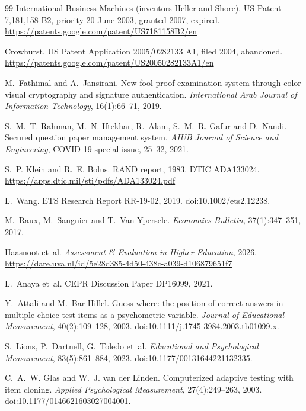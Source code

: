 \documentclass[10pt,a4paper]{article}
\theoremstyle{remark}
\begin{document}
\begin{thebibliography}{99}
 International Business Machines (inventors Heller and Shore). US Patent 7,181,158 B2, priority 20 June 2003, granted 2007, expired. \url{https://patents.google.com/patent/US7181158B2/en}

 Crowhurst. US Patent Application 2005/0282133 A1, filed 2004, abandoned. \url{https://patents.google.com/patent/US20050282133A1/en}

 M.~Fathimal and A.~Jansirani. New fool proof examination system through color visual cryptography and signature authentication. \emph{International Arab Journal of Information Technology}, 16(1):66--71, 2019.

 S.~M.~T. Rahman, M.~N. Iftekhar, R.~Alam, S.~M.~R. Gafur and D.~Nandi. Secured question paper management system. \emph{AIUB Journal of Science and Engineering}, COVID-19 special issue, 25--32, 2021.

 S.~P. Klein and R.~E. Bolus. RAND report, 1983. DTIC ADA133024. \url{https://apps.dtic.mil/sti/pdfs/ADA133024.pdf}

 L.~Wang. ETS Research Report RR-19-02, 2019. doi:10.1002/ets2.12238.

 M.~Raux, M.~Sangnier and T.~Van Ypersele. \emph{Economics Bulletin}, 37(1):347--351, 2017.

 Haasnoot et~al. \emph{Assessment \& Evaluation in Higher Education}, 2026. \url{https://dare.uva.nl/id/5e28d385-4d50-438c-a039-d106879651f7}

 L.~Anaya et~al. CEPR Discussion Paper DP16099, 2021.

 Y.~Attali and M.~Bar-Hillel. Guess where: the position of correct answers in multiple-choice test items as a psychometric variable. \emph{Journal of Educational Measurement}, 40(2):109--128, 2003. doi:10.1111/j.1745-3984.2003.tb01099.x.

 S.~Lions, P.~Dartnell, G.~Toledo et~al. \emph{Educational and Psychological Measurement}, 83(5):861--884, 2023. doi:10.1177/00131644221132335.

 C.~A.~W. Glas and W.~J. van der Linden. Computerized adaptive testing with item cloning. \emph{Applied Psychological Measurement}, 27(4):249--263, 2003. doi:10.1177/0146621603027004001.


\end{thebibliography}
\end{document}
